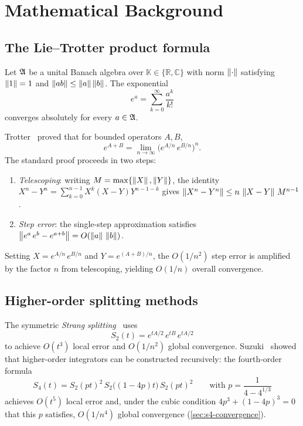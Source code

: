 \section{Mathematical Background}
\label{sec:background}

\subsection{The Lie--Trotter product formula}
\label{sec:bg-trotter}

Let $\mathfrak{A}$ be a unital Banach algebra over $\mathbb{K} \in \{\mathbb{R}, \mathbb{C}\}$
with norm $\left\|\cdot\right\|$ satisfying $\left\|1\right\| = 1$ and $\left\|ab\right\| \le \left\|a\right\|\left\|b\right\|$.
The exponential
\[
  e^a = \sum_{k=0}^{\infty} \frac{a^k}{k!}
\]
converges absolutely for every $a \in \mathfrak{A}$.

Trotter~\cite{trotter1959product} proved that for bounded operators $A, B$,
\[
  e^{A+B} = \lim_{n\to\infty} \bigl(e^{A/n}\,e^{B/n}\bigr)^n.
\]
The standard proof proceeds in two steps:
\begin{enumerate}
  \item \emph{Telescoping}: writing $M = \max\{\left\|X\right\|,\left\|Y\right\|\}$,
    the identity
    $X^n - Y^n = \sum_{k=0}^{n-1} X^k(X-Y)Y^{n-1-k}$ gives
    $\left\|X^n - Y^n\right\| \le n\,\left\|X-Y\right\|\,M^{n-1}$.

  \item \emph{Step error}: the single-step approximation satisfies
    $\left\|e^a\,e^b - e^{a+b}\right\| = O(\left\|a\right\|\,\left\|b\right\|)$.
\end{enumerate}
Setting $X = e^{A/n}\,e^{B/n}$ and $Y = e^{(A+B)/n}$, the $O(1/n^2)$ step
error is amplified by the factor $n$ from telescoping, yielding $O(1/n)$
overall convergence.

\subsection{Higher-order splitting methods}
\label{sec:bg-splitting}

The symmetric \emph{Strang splitting}~\cite{strang1968construction} uses
\[
  S_2(t) = e^{tA/2}\,e^{tB}\,e^{tA/2}
\]
to achieve $O(t^3)$ local error and $O(1/n^2)$ global convergence.
Suzuki~\cite{suzukiGeneralTheoryFractal1991} showed that higher-order integrators can be
constructed recursively: the fourth-order formula
\[
  S_4(t) = S_2(pt)^2\,S_2\bigl((1-4p)t\bigr)\,S_2(pt)^2
  \qquad \text{with } p = \frac{1}{4 - 4^{1/3}}
\]
achieves $O(t^5)$ local error and, under the cubic condition
$4p^3 + (1-4p)^3 = 0$ that this $p$ satisfies, $O(1/n^4)$ global
convergence (\cref{sec:s4-convergence}).


